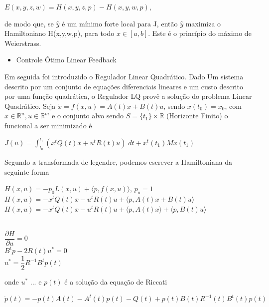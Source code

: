 \documentclass[12pt, a4paper]{article}
\begin{document}
\begin{center}
$E(x,y,z,w)=H(x,y,z,p)-H(x,y,w,p)$,
\end{center}

de modo que, se $\hat{y}$ é um mínimo forte local para J, então $\hat{y}$ maximiza o Hamiltoniano H(x,y,w,p), para todo $x \in [a,b]$. Este é o princípio do máximo de Weierstrass.

\begin{itemize}
\item Controle Ótimo Linear Feedback
\end{itemize}

Em seguida foi introduzido o Regulador Linear Quadrático. Dado Um sistema descrito por um conjunto de equações diferenciais lineares e um custo descrito por uma função quadrática, o Regulador LQ provê a solução do problema Linear Quadrático.
Seja $\dot{x} = f(x,u) = A(t)x + B(t)u$, sendo $x(t_0) = x_0$, com $x \in \mathbb{R}^n, u \in \mathbb{R}^m$  e o conjunto alvo sendo $S= \lbrace t_1\rbrace \times \mathbb{R}$ (Horizonte Finito) o funcional a ser minimizado é

\begin{center}
$ J(u) = \int_{t_0}^{t_1} (x^tQ(t)x + u^tR(t)u) \; dt + x^t(t_1)Mx(t_1) $
\end{center} 

Segundo a transformada de legendre, podemos escrever a Hamiltoniana  da seguinte forma

\begin{center}

$H(x,u) = -p_0L(x,u) + \langle p, f(x,u) \rangle$, $p_o = 1$ \\
$H(x,u) = -x^tQ(t)x - u^tR(t)u + \langle p, A(t)x + B(t)u \rangle$\\
$H(x,u) = -x^tQ(t)x - u^tR(t)u + \langle p, A(t)x \rangle + \langle p, B(t)u \rangle$\\\

$ \dfrac{\partial H}{\partial u} = 0 $\\
$ B^tp - 2R(t)u^* = 0 $\\
$u^* = \dfrac{1}{2}R^{-1}B^tp(t)$\\
\end{center}

onde $u^*$ ... e $p(t)$ é a solução da equação de Riccati 

\begin{center}
$ \dot{p}(t) = -p(t)A(t) - A^t(t)p(t) - Q(t) + p(t)B(t)R^{-1}(t)B^t(t)p(t)$
\end{center}
\newpage
\end{document}
